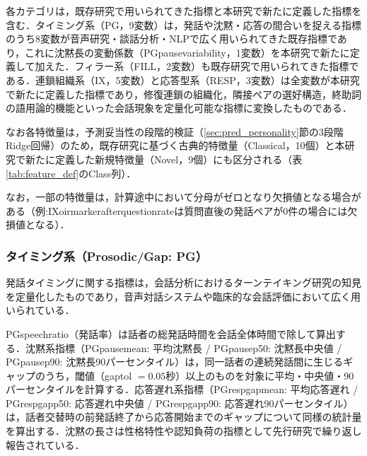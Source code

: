 \documentclass[dvipdfmx,11pt,a4paper]{bxjsarticle}
\renewcommand{\_}{\paperorigunderscore\allowbreak}%
\begin{document}
各カテゴリは，既存研究で用いられてきた指標と本研究で新たに定義した指標を含む．タイミング系（PG，9変数）は，発話や沈黙・応答の間合いを捉える指標のうち8変数が音声研究・談話分析・NLPで広く用いられてきた既存指標であり，これに沈黙長の変動係数（PG\_pause\_variability，1変数）を本研究で新たに定義して加えた．フィラー系（FILL，2変数）も既存研究で用いられてきた指標である．連鎖組織系（IX，5変数）と応答型系（RESP，3変数）は全変数が本研究で新たに定義した指標であり，修復連鎖の組織化\cite{schegloff1977}，隣接ペアの選好構造\cite{sacks1974}，終助詞の語用論的機能といった会話現象を定量化可能な指標に変換したものである．

なお各特徴量は，予測妥当性の段階的検証（\ref{sec:pred_personality}節の3段階Ridge回帰）のため，既存研究に基づく古典的特徴量（Classical，10個）と本研究で新たに定義した新規特徴量（Novel，9個）にも区分される（表\ref{tab:feature_def}のClass列）．

なお，一部の特徴量は，計算途中において分母がゼロとなり欠損値となる場合がある（例:IX\_oirmarker\_after\_question\_rateは質問直後の発話ペアが0件の場合には欠損値となる）．


\subsubsection{タイミング系（Prosodic/Gap: PG）}
発話タイミングに関する指標は，会話分析におけるターンテイキング研究\cite{sacks1974}の知見を定量化したものであり，音声対話システムや臨床的な会話評価において広く用いられている\cite{levitan2012,deruiter2006}．

PG\_speech\_ratio（発話率）は話者の総発話時間を会話全体時間で除して算出する．沈黙系指標（PG\_pause\_mean: 平均沈黙長 / PG\_pause\_p50: 沈黙長中央値 / PG\_pause\_p90: 沈黙長90パーセンタイル）は，同一話者の連続発話間に生じるギャップのうち，閾値（gap\_tol $= 0.05$秒）以上のものを対象に平均・中央値・90パーセンタイルを計算する．応答遅れ系指標（PG\_resp\_gap\_mean: 平均応答遅れ / PG\_resp\_gap\_p50: 応答遅れ中央値 / PG\_resp\_gap\_p90: 応答遅れ90パーセンタイル）は，話者交替時の前発話終了から応答開始までのギャップについて同様の統計量を算出する．沈黙の長さは性格特性や認知負荷の指標として先行研究で繰り返し報告されている\cite{campione2002}．
\end{document}
